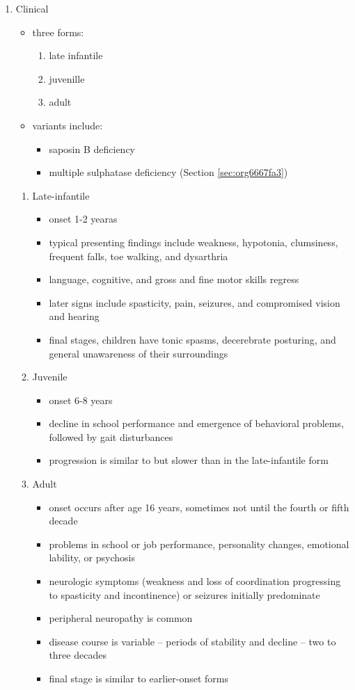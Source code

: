 \documentclass{scrartcl}
\begin{document}
\begin{enumerate}
\item Clinical
\label{sec:org241a244}
\begin{itemize}
\item three forms:
\begin{enumerate}
\item late infantile
\item juvenille
\item adult
\end{enumerate}
\item variants include:
\begin{itemize}
\item saposin B deficiency
\item multiple sulphatase deficiency (Section \ref{sec:org6667fa3})
\end{itemize}
\end{itemize}
\begin{enumerate}
\item Late-infantile
\label{sec:orgd5a3ce2}
\begin{itemize}
\item onset 1-2 yearas
\item typical presenting findings include weakness, hypotonia, clumsiness, frequent falls, toe walking, and dysarthria
\item language, cognitive, and gross and fine motor skills regress
\item later signs include spasticity, pain, seizures, and compromised vision and hearing
\item final stages, children have tonic spasms, decerebrate posturing, and
general unawareness of their surroundings
\end{itemize}

\item Juvenile
\label{sec:orge91e204}
\begin{itemize}
\item onset 6-8 years
\item decline in school performance and emergence of behavioral problems, followed by gait disturbances
\item progression is similar to but slower than in the late-infantile form
\end{itemize}

\item Adult
\label{sec:org06b6632}
\begin{itemize}
\item onset occurs after age 16 years, sometimes not until the fourth or fifth decade
\item problems in school or job performance, personality changes, emotional lability, or psychosis
\item neurologic symptoms (weakness and loss of coordination progressing
to spasticity and incontinence) or seizures initially
predominate
\item peripheral neuropathy is common
\item disease course is variable – periods of stability and decline – two to three decades
\item final stage is similar to earlier-onset forms
\end{itemize}
\end{enumerate}


\end{enumerate}
\end{document}
